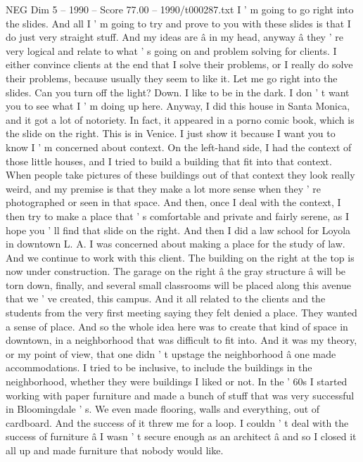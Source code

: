 \begin{textsample}{NEG Dim 5 – 1990 – Score 77.00 – 1990/t000287.txt}  \label{ex:f5_neg_081}
I ' m going to go right into the slides.
And all I ' m going to try and prove to you with these slides is that I do just very straight stuff.
And my ideas are â in my head, anyway â they ' re very logical and relate to what ' s going on and problem solving for clients.
I either convince clients at the end that I solve their problems, or I really do solve their problems, because usually they seem to like it.
Let me go right into the slides.
Can you turn off the light?
Down.
I like to be in the dark.
I don ' t want you to see what I ' m doing up here.
Anyway, I did this house in Santa Monica, and it got a lot of notoriety.
In fact, it appeared in a porno comic book, which is the slide on the right.
This is in Venice.
I just show it because I want you to know I ' m concerned about context.
On the left-hand side, I had the context of those little houses, and I tried to build a building that fit into that context.
When people take pictures of these buildings out of that context they look really weird, and my premise is that they make a lot more sense when they ' re photographed or seen in that space.
And then, once I deal with the context, I then try to make a place that ' s comfortable and private and fairly serene, as I hope you ' ll find that slide on the right.
And then I did a law school for Loyola in downtown L.
A.
I was concerned about making a place for the study of law.
And we continue to work with this client.
The building on the right at the top is now under construction.
The garage on the right â the gray structure â will be torn down, finally, and several small classrooms will be placed along this avenue that we ' ve created, this campus.
And it all related to the clients and the students from the very first meeting saying they felt denied a place.
They wanted a sense of place.
And so the whole idea here was to create that kind of space in downtown, in a neighborhood that was difficult to fit into.
And it was my theory, or my point of view, that one didn ' t upstage the neighborhood â one made accommodations.
I tried to be inclusive, to include the buildings in the neighborhood, whether they were buildings I liked or not.
In the ' 60s I started working with paper furniture and made a bunch of stuff that was very successful in Bloomingdale ' s.
We even made flooring, walls and everything, out of cardboard.
And the success of it threw me for a loop.
I couldn ' t deal with the success of furniture â I wasn ' t secure enough as an architect â and so I closed it all up and made furniture that nobody would like.

\end{textsample}
